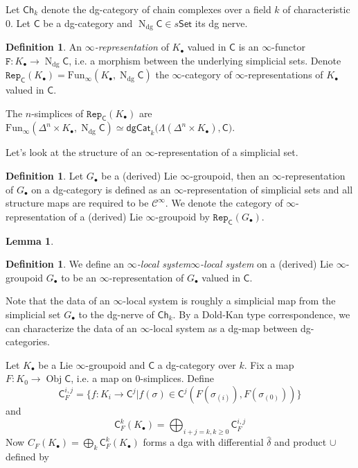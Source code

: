\documentclass[12pt]{amsart}
\newtheorem{lem}[thm]{Lemma}
\theoremstyle{definition}
\newtheorem{defn}[thm]{Definition}
\theoremstyle{remark}
\numberwithin{equation}{section}
\newcommand{\CC}{{\mathsf C}}
\newcommand{\cinf}{{\mathcal C}^{\infty}}
\newcommand{\1}{{\mathbb{1}}}
\newcommand{\ob}{\operatorname{Obj}}
\newcommand{\set}{\mathsf{Set}}
\newcommand{\Ch}{\mathsf{Ch}}
\newcommand{\dgcat}{\mathsf{dgCat}}
\newcommand{\repi}{\mathtt{Rep}}
\newcommand{\n}{\operatorname{N}}
\newcommand{\dg}{{\operatorname{dg}}}
\newcommand{\funi}{\operatorname{Fun_{\infty}}}
\begin{document}
Let $\Ch_k$ denote the dg-category of chain complexes over a field $k$ of characteristic 0. Let $\CC$ be a dg-category and $\n_{\dg}\CC \in s\set$ its dg nerve.  
\begin{defn}
	An {\it $\infty$-representation} of $K_{\bullet}$ valued in $\CC$ is an $\infty$-functor $\mathtt{F}: K_{\bullet} \to \n_{\dg}\CC$, i.e. a morphism between the underlying simplicial sets. Denote $\repi_{\CC }(K_{\bullet}) = \funi(K_{\bullet}, \n_{\dg}\CC)$ the $\infty$-category of $\infty$-representations of $K_{\bullet}$ valued in $\CC$. 
\end{defn} 

The $n$-simplices of $\repi_{\CC }(K_{\bullet})$ are $\funi(\Delta^n \times K_{\bullet}, \n_{\dg}\CC)\simeq \dgcat_k\big(\Lambda(\Delta^n \times K_{\bullet}), \CC \big)$.

Let's look at the structure of an $\infty$-representation of a simplicial set. 

\begin{defn}
    Let $G_{\bullet}$ be a (derived) Lie $\infty$-groupoid, then an $\infty$-representation of $G_{\bullet}$ on a dg-category is defined as an $\infty$-representation of simplicial sets and all structure maps are required to be $\cinf$. We denote the category of $\infty$-representation of a (derived) Lie $\infty$-groupoid by $\repi_{\CC }(G_{\bullet})$. 
\end{defn}

\begin{lem}
    
\end{lem}

\begin{defn}
    We define an {\it $\infty$-local system}{\it $\infty$-local system} on a (derived) Lie ${\infty}$-groupoid $G_{\bullet}$ to be an $\infty$-representation of $G_{\bullet}$ valued in $\CC$.
\end{defn}

Note that the data of an $\infty$-local system is roughly a simplicial map from the simplicial set $G_{\bullet}$ to the dg-nerve of $\Ch_k$. By a Dold-Kan type correspondence, we can characterize the data of an $\infty$-local system as a dg-map between dg-categories. 

Let $K_{\bullet}$ be a Lie $\infty$-groupoid and $\CC$ a dg-category over $k$. Fix a map $F: K_0 \to \ob \CC$, i.e. a map on 0-simplices. Define $$\CC^{i,j}_F = \{f: K_i \to \CC^j | f(\sigma) \in \CC^j(F(\sigma_{(i)}), F(\sigma_{(0)})) \}$$
and 
$$
\CC^k_F(K_{\bullet}) = \bigoplus_{i+j = k, k\ge 0} \CC^{i, j}_F
$$
Now $C_F(K_{\bullet}) = \bigoplus_k \CC^k_F(K_{\bullet})$ forms a dga with differential $\hat{\delta}$ and product $\cup$ defined by
\end{document}
